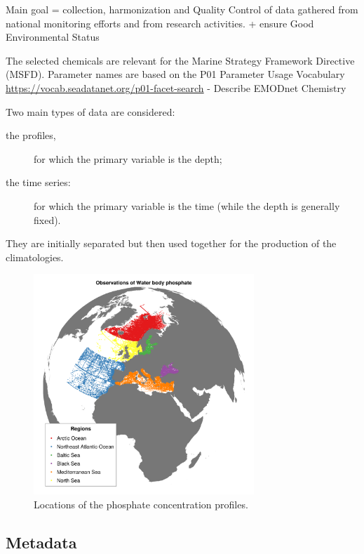 \documentclass[essd, manuscript]{copernicus}
\begin{document}
Main goal = collection, harmonization and Quality Control of data gathered from national monitoring efforts and from research activities.
+ ensure Good Environmental Status \citep{Vinci2017}

 
The selected chemicals are relevant for the Marine Strategy Framework Directive (MSFD). 
Parameter names are based on the P01 Parameter Usage Vocabulary \url{https://vocab.seadatanet.org/p01-facet-search}
- Describe EMODnet Chemistry \citep{Giorgetti2018}

Two main types of data are considered: 
\begin{description}
\item[the profiles,] for which the primary variable is the depth;
\item[the time series:] for which the primary variable is the time (while the depth is generally fixed).
\end{description}
They are initially separated but then used together for the production of the climatologies. 

\begin{figure}[t]
\includegraphics[width=8.3cm]{observations_Water_body_phosphate.png}
\caption{Locations of the phosphate concentration profiles.\label{fig:phosphatedata}}
\end{figure}
%

\subsection{Metadata}
\end{document}
